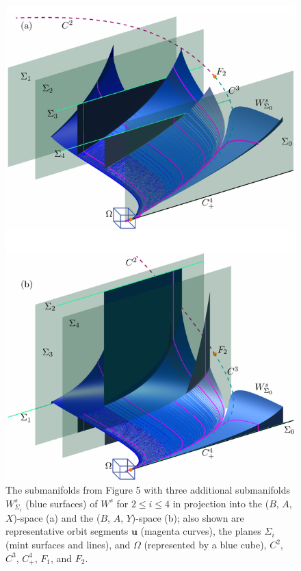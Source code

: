 \documentclass{ws-ijbc}
\begin{document}
\begin{figure}[H]
\centering
\includegraphics[]{./figures/MKMO_6.pdf}
\caption{The submanifolds from Figure 5 with three additional submanifolds $W^s_{\Sigma_i}$ (blue surfaces) of $W^s$ for $2 \leq i \leq 4$ in projection into the ($B$, $A$, $X$)-space (a) and the ($B$, $A$, $Y$)-space (b); also shown are representative orbit segments $\mathbf{u}$ (magenta curves), the planes $\Sigma_i$ (mint surfaces and lines), and $\Omega$ (represented by a blue cube), $C^2$, $C^3$, $C^4_+$, $F_1$, and $F_2$.}
\label{figure_6}
\end{figure}
\end{document}
